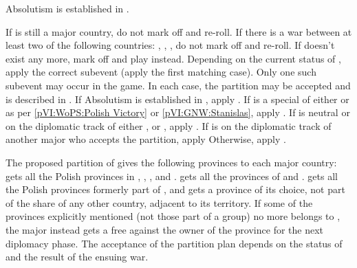 \phevnt
\aparag Absolutism is established in \payspologne.





\condition{}
\aparag If \POL is still a major country, do not mark off and re-roll.
\aparag If there is a war between at least two of the following countries:
\RUS, \AUS, \PRU, do not mark off and re-roll.
\aparag If \payspologne doesn't exist any more, mark off and play \RD instead.
\aparag Depending on the current status of \payspologne, apply the correct
subevent (apply the first matching case). Only one such subevent may occur in
the game. In each case, the partition may be accepted and is described in
.
\bparag If Absolutism is established in \payspologne, apply
.
\aparag If \payspologne is a special \EG of either \FRA or \SUE as per
\ref{pVI:WoPS:Polish Victory} or \ref{pVI:GNW:Stanislas}, apply
.
\bparag If \payspologne is neutral or on the diplomatic track of either \RUS,
\AUS or \PRU, apply .
\bparag If \payspologne is on the diplomatic track of another major who
accepts the partition, apply 
\bparag Otherwise, apply .


\aparag The proposed partition of \payspologne gives the following provinces
to each major country:
\bparag \RUS gets all the Polish provinces in \regionUkraine,
\provinceSeveria, \provinceSmolenska, \provinceBaltarusija and
\provincePolacak.
\bparag \PRU gets all the provinces of  and
.
\bparag \AUS gets all the Polish provinces formerly part of \payshongrie,
\provinceMorava and \provinceMalopolska
\bparag \SUE gets a province of its choice, not part of the share of any other
country, adjacent to its territory.
\aparag If some of the provinces explicitly mentioned (not those part of a
group) no more belongs to \payspologne, the major instead gets a free \CB
against the owner of the province for the next diplomacy phase.
\aparag The acceptance of the partition plan depends on the status of
\payspologne and the result of the ensuing war.



